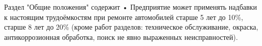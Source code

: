 Раздел "Общие положения" содержит
    • Предприятие может применять надбавки к настоящим трудоёмкостям при ремонте автомобилей старше 5 лет до 10\%, старше 8 лет до 20\% (кроме работ разделов: техническое обслуживание, окраска, антикоррозионная обработка, поиск не явно выраженных неисправностей).
    
    

